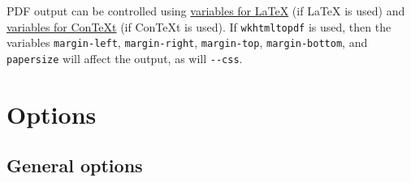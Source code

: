 \documentclass[]{article}
\begin{document}
PDF output can be controlled using
\protect\hyperlink{variables-for-latex}{variables for LaTeX} (if LaTeX
is used) and \protect\hyperlink{variables-for-context}{variables for
ConTeXt} (if ConTeXt is used). If \texttt{wkhtmltopdf} is used, then the
variables \texttt{margin-left}, \texttt{margin-right},
\texttt{margin-top}, \texttt{margin-bottom}, and \texttt{papersize} will
affect the output, as will \texttt{-\/-css}.

\section{Options}\label{options}

\subsection{General options}\label{general-options}
\end{document}
